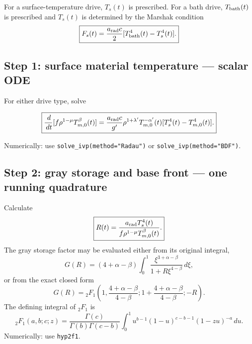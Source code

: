 \documentclass[11pt]{article}
\numberwithin{equation}{section}
\newcommand{\Ts}{T_s}
\newcommand{\Tb}{T_{\rm bath}}
\newcommand{\Tm}{T_{m,0}}
\newcommand{\arad}{a_{\rm rad}}
\newcommand{\dif}{\,d}
\begin{document}
For a surface-temperature drive, $\Ts(t)$ is prescribed.  For a bath drive,
$\Tb(t)$ is prescribed and $\Ts(t)$ is determined by the Marshak condition
\begin{equation}
 \boxed{
 F_s(t)=\frac{\arad c}{2}
 [\Tb^4(t)-\Ts^4(t)].}
 \label{eq:sum_marshak}
\end{equation}

\subsection*{Step 1: surface material temperature --- scalar ODE}

For either drive type, solve
\begin{resultbox}
\begin{equation}
 \boxed{
 \frac{\dif}{\dif t}
 [f\rho^{1-\mu}\Tm^\beta(t)]
 =\frac{\arad c}{g'}\rho^{1+\lambda'}
 \Tm^{-\alpha'}(t)[\Ts^4(t)-\Tm^4(t)].}
 \label{eq:sum_Tm_ode}
\end{equation}
\end{resultbox}
Numerically: use \texttt{solve\_ivp(method="Radau")} or
\texttt{solve\_ivp(method="BDF")}.

\subsection*{Step 2: gray storage and base front --- one running quadrature}

Calculate
\begin{equation}
 \boxed{
 R(t)=\frac{\arad\Ts^4(t)}
 {f\rho^{1-\mu}\Tm^\beta(t)}.}
 \label{eq:sum_R}
\end{equation}
The gray storage factor may be evaluated either from its original integral,
\begin{equation}
 \boxed{
 G(R)=(4+\alpha-\beta)
 \int_0^1\frac{\xi^{3+\alpha-\beta}}
 {1+R\xi^{4-\beta}}\dif\xi,}
 \label{eq:sum_G_integral}
\end{equation}
or from the exact closed form
\begin{equation}
 \boxed{
 G(R)={}_2F_1\!\left(
 1,\frac{4+\alpha-\beta}{4-\beta};
 1+\frac{4+\alpha-\beta}{4-\beta};-R\right).}
 \label{eq:sum_G_hyper}
\end{equation}
The defining integral of ${}_2F_1$ is
\begin{equation}
 {}_2F_1(a,b;c;z)
 =\frac{\Gamma(c)}{\Gamma(b)\Gamma(c-b)}
 \int_0^1u^{b-1}(1-u)^{c-b-1}(1-zu)^{-a}\dif u.
 \label{eq:sum_2F1_integral}
\end{equation}
Numerically: use \texttt{hyp2f1}.
\end{document}
